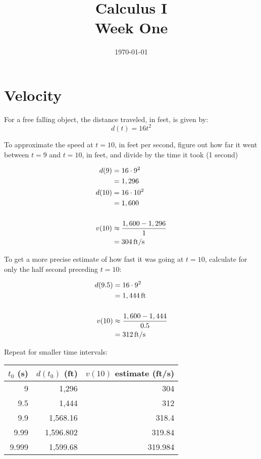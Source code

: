 \documentclass[letterpaper, landscape]{exam}
\author{}
\date{\today}
\title{Calculus I \\ Week One}
\begin{document}
  \maketitle
  \tableofcontents

  \section{Velocity}

  For a free falling object, the distance traveled, in feet, is given by:
  \[
    d(t) = 16 t^2
  \]

  To approximate the speed at $t = 10$, in feet per second, figure out how far
  it went between $t = 9$ and $t = 10$, in feet, and divide by the time it took
  (1 second)

  \begin{align*}
    d(9)  & = 16 \cdot 9^2 \\
          & = 1,296 \\
    d(10) & = 16 \cdot 10^2 \\
          & = 1,600 \\
    \\
    v(10) &\approx \frac{1,600 - 1,296}{1} \\
          &= \unit[304]{ft/s} \\
  \end{align*}

  To get a more precise estimate of how fast it was going at $t = 10$, calculate
  for only the half second preceding $t = 10$:

  \begin{align*}
    d(9.5) & = 16 \cdot 9^2 \\
           & = \unit[1,444]{ft} \\
    \\
    v(10)  & \approx \frac{1,600 - 1,444}{0.5} \\
           & = \unit[312]{ft/s} \\
  \end{align*}

  Repeat for smaller time intervals:

  \begin{tabular}[H]{rrr}
    \toprule
    $t_0$ (s) & $d(t_0)$ (ft) & $v(10)$ estimate (ft/s) \\
    \midrule
    9         & 1,296         & 304 \\
    9.5       & 1,444         & 312 \\
    9.9       & 1,568.16      & 318.4 \\
    9.99      & 1,596.802     & 319.84 \\
    9.999     & 1,599.68      & 319.984 \\
    \bottomrule
  \end{tabular}
\end{document}
